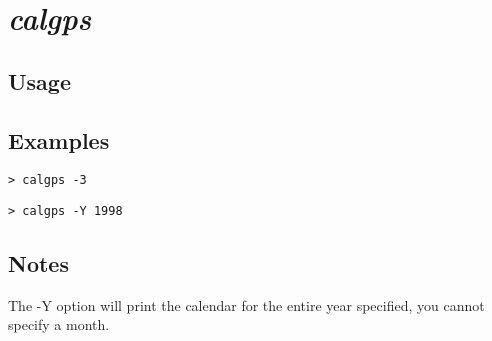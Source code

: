 \section{\emph{calgps}}
\subsection{Usage}
\subsection{Examples}
\begin{verbatim}
> calgps -3
\end{verbatim}
\begin{verbatim}
> calgps -Y 1998
\end{verbatim}
\subsection{Notes}
The -Y option will print the calendar for the entire year specified, you cannot specify a month.


